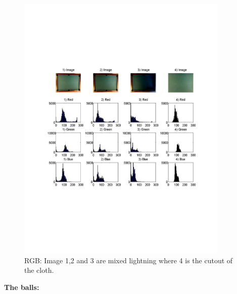 \begin{figure}[H]
\begin{center}
\leavevmode
\includegraphics[width=0.9\textwidth]{images/table_hist_rgb.pdf}
\end{center}
\caption{RGB: Image 1,2 and 3 are mixed lightning where 4 is the cutout of the cloth.}
\label{fig:tablergb}
\end{figure}




\textbf{The balls:}\\